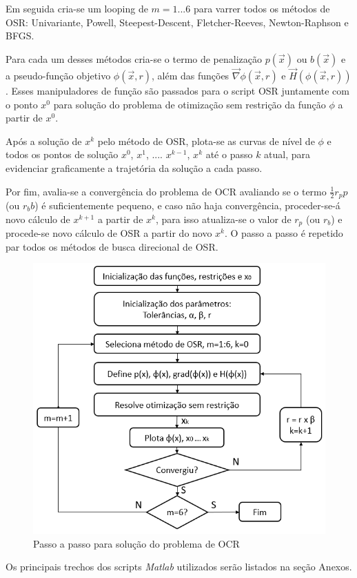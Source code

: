 \documentclass[10pt, a4paper]{article}
\begin{document}
Em seguida cria-se um looping de $m=1...6$ para varrer todos os m\'etodos de OSR: Univariante, Powell, Steepest-Descent, Fletcher-Reeves, Newton-Raphson e BFGS.

 Para cada um desses m\'etodos cria-se o termo de penaliza\c c\~ao $p(\vec{x})$ ou $b(\vec{x})$ e a pseudo-fun\c c\~ao objetivo $\phi(\vec{x}, r)$, al\'em das fun\c c\~oes $\vec{\nabla} \phi(\vec{x}, r)$ e $\vec{H}(\phi(\vec{x}, r))$. Esses manipuladores de fun\c c\~ao s\~ao passados para o script OSR juntamente com o ponto $x^0$ para solu\c c\~ao do problema de otimiza\c c\~ao sem restri\c c\~ao da fun\c c\~ao $\phi$ a partir de $x^0$.

 Ap\'os a solu\c c\~ao de $x^k$ pelo m\'etodo de OSR, plota-se as curvas de n\'ivel de $\phi$ e todos os pontos de solu\c c\~ao $x^0$, $x^1$, .... $x^{k-1}$, $x^k$ at\'e o passo $k$ atual, para evidenciar graficamente a trajet\'oria da solu\c c\~ao a cada passo.

 Por fim, avalia-se a converg\^encia do problema de OCR avaliando se o termo $\frac{1}{2} r_p p$ (ou $r_b b$) \'e suficientemente pequeno, e caso n\~ao haja converg\^encia, proceder-se-\'a novo c\'alculo de $x^{k+1}$ a partir de $x^k$, para isso atualiza-se o valor de $r_p$ (ou $r_b$) e procede-se novo c\'alculo de OSR a partir do novo $x^k$. O passo a passo \'e repetido par todos os m\'etodos de busca direcional de OSR.

\begin{figure}[H]
      \centering
      \includegraphics[width=.7\textwidth]{workflow.PNG}
      \caption{Passo a passo para solu\c c\~ao do problema de OCR}
      \label{fig:workflow}
\end{figure}

Os principais trechos dos scripts \textit{Matlab} utilizados ser\~ao listados na se\c c\~ao Anexos.
\end{document}

